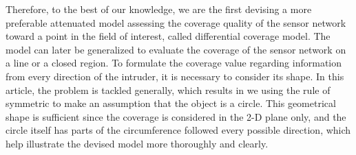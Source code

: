 \documentclass[3p]{elsarticle}
\begin{document}
%
Therefore, to the best of our knowledge, we are the first devising a more preferable attenuated model assessing the coverage quality of the sensor network toward a point in the field of interest, called differential coverage model. The model can later be generalized to evaluate the coverage of the sensor network on a line or a closed region. To formulate the coverage value regarding information from every direction of the intruder, it is necessary to consider its shape. In this article, the problem is tackled generally, which results in we using the rule of symmetric to make an assumption that the object is a circle. This geometrical shape is sufficient since the coverage is considered in the 2-D plane only, and the circle itself has parts of the circumference followed every possible direction, which help illustrate the devised model more thoroughly and clearly.\par
\end{document}
